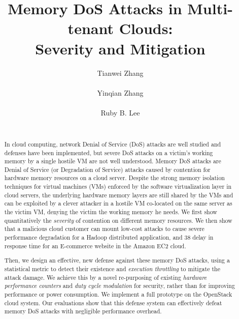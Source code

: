\documentclass{sig-alternate}
\newcommand{\attackname}{memory DoS attacks\xspace}
\begin{document}
\title{Memory DoS Attacks in Multi-tenant Clouds: \\Severity and Mitigation}

\author{
\alignauthor
Tianwei Zhang\\
       \\
\alignauthor
Yinqian Zhang\\
       \\
\alignauthor
Ruby B. Lee\\
       \\
}

\maketitle



\begin{abstract}

In cloud computing, network Denial of Service (DoS) attacks are well studied and defenses have been implemented, but severe DoS attacks on a victim's working memory by a single hostile VM are not well understood. Memory DoS attacks are Denial of Service (or Degradation of Service) attacks caused by contention for hardware memory resources on a cloud server. Despite the strong memory isolation techniques for virtual machines (VMs) enforced by the software virtualization layer in cloud servers, the underlying hardware memory layers are still shared by the VMs and can be exploited by a clever attacker in a hostile VM co-located on the same server as the victim VM, denying the victim the working memory he needs. We first show quantitatively the \emph{severity} of contention on different memory resources. We then show that a malicious cloud customer can mount low-cost attacks to cause severe performance degradation for a Hadoop distributed application, and 38 delay in response time for an E-commerce website in the Amazon EC2 cloud.

Then, we design an effective, new defense against these \attackname, using a statistical metric to detect their existence and \emph{execution throttling} to mitigate the attack damage. We achieve this by a novel re-purposing of existing \textit{hardware performance counters} and \textit{duty cycle modulation} for security, rather than for improving performance or power consumption. We implement a full prototype on the OpenStack cloud system. Our evaluations show that this defense system can effectively defeat \attackname with negligible performance overhead.

\end{abstract}
\end{document}

